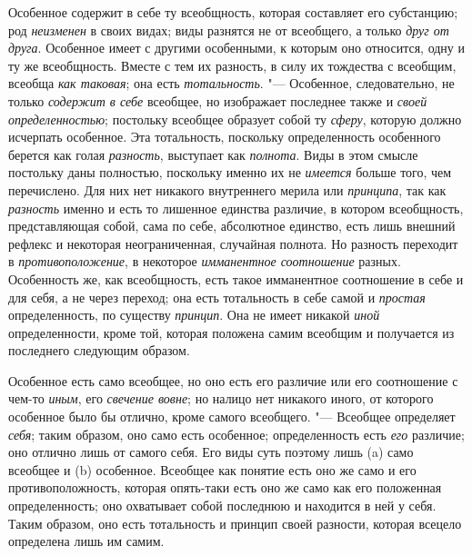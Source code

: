 Особенное содержит в себе ту всеобщность, которая составляет
его субстанцию; род {\em неизменен}
в своих видах; виды разнятся не от всеобщего, а только
{\em друг от друга}.
Особенное имеет с другими особенными, к которым оно
относится, одну и ту же всеобщность. Вместе с тем их
разность,
в силу их тождества с всеобщим, всеобща
{\em как таковая}; она
есть {\em тотальность}. "---
Особенное, следовательно, не только
{\em содержит в себе}
всеобщее, но изображает последнее также и
{\em своей определенностью};
постольку всеобщее образует собой ту
{\em сферу}, которую
должно исчерпать особенное. Эта тотальность, поскольку определенность
особенного берется как голая
{\em разность}, выступает
как {\em полнота}. Виды в
этом смысле постольку даны полностью, поскольку именно их не
{\em имеется} больше
того, чем перечислено. Для них нет никакого внутреннего мерила или
{\em принципа}, так как
{\em разность} именно и
есть то лишенное единства различие, в котором всеобщность, представляющая
собой, сама по себе, абсолютное единство, есть лишь внешний рефлекс и
некоторая неограниченная, случайная полнота. Но разность переходит в
{\em противоположение}, в
некоторое {\em имманентное соотношение}
разных. Особенность же, как всеобщность, есть такое
имманентное соотношение в себе и для себя, а не через переход; она есть
тотальность в себе самой и
{\em простая}
определенность, по существу
{\em принцип}. Она не
имеет никакой {\em иной}
определенности, кроме той, которая положена самим всеобщим и
получается из последнего следующим образом.

Особенное есть само всеобщее, но оно есть его различие или его
соотношение с чем-то {\em иным},
его {\em свечение
вовне}; но налицо нет никакого иного, от которого
особенное было бы отлично, кроме самого всеобщего. "---
Всеобщее определяет
{\em себя}; таким
образом, оно само есть особенное; определенность есть
{\em его} различие; оно
отлично лишь от самого себя. Его виды суть поэтому лишь (a)
само всеобщее и (b) особенное. Всеобщее как понятие есть оно
же само и его противоположность, которая опять-таки есть оно же само как
его положенная определенность; оно охватывает собой последнюю и находится в
ней у себя. Таким образом, оно есть тотальность и принцип своей разности,
которая всецело определена лишь им самим.

